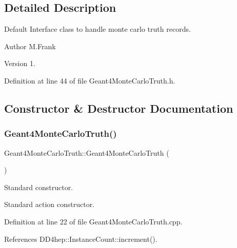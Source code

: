 \subsection{Detailed Description}
Default Interface class to handle monte carlo truth records. 

\begin{DoxyAuthor}{Author}
M.\+Frank 
\end{DoxyAuthor}
\begin{DoxyVersion}{Version}
1. 
\end{DoxyVersion}


Definition at line 44 of file Geant4\+Monte\+Carlo\+Truth.\+h.



\subsection{Constructor \& Destructor Documentation}
\hypertarget{class_d_d4hep_1_1_simulation_1_1_geant4_monte_carlo_truth_a2b9a9965ca3752b2f4e1a9e267f3c4cc}{}\label{class_d_d4hep_1_1_simulation_1_1_geant4_monte_carlo_truth_a2b9a9965ca3752b2f4e1a9e267f3c4cc} 
\subsubsection{\texorpdfstring{Geant4\+Monte\+Carlo\+Truth()}{Geant4MonteCarloTruth()}}
{\footnotesize\ttfamily Geant4\+Monte\+Carlo\+Truth\+::\+Geant4\+Monte\+Carlo\+Truth (\begin{DoxyParamCaption}{ }\end{DoxyParamCaption})\hspace{0.3cm}{\ttfamily [protected]}}



Standard constructor. 

Standard action constructor. 

Definition at line 22 of file Geant4\+Monte\+Carlo\+Truth.\+cpp.



References D\+D4hep\+::\+Instance\+Count\+::increment().

\hypertarget{class_d_d4hep_1_1_simulation_1_1_geant4_monte_carlo_truth_acc1f5693c904777e8470b7df290d1c2c}{}\label{class_d_d4hep_1_1_simulation_1_1_geant4_monte_carlo_truth_acc1f5693c904777e8470b7df290d1c2c} 
